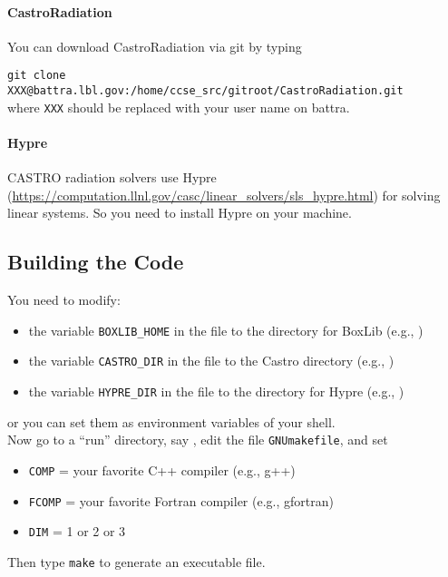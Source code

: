 \documentclass[11pt,letterpaper]{article}
\begin{document}
\paragraph{CastroRadiation} You can download CastroRadiation via git by typing
\vspace{5pt}

\verb|git clone XXX@battra.lbl.gov:/home/ccse_src/gitroot/CastroRadiation.git|\\[5pt]
where {\tt XXX} should be replaced with your user name on battra.  

\paragraph{Hypre} CASTRO radiation solvers use Hypre
(\url{https://computation.llnl.gov/casc/linear_solvers/sls_hypre.html})
for solving linear systems.  So you need to install Hypre on your
machine.

\subsection{Building the Code}

You need to modify:
\begin{itemize}
\item the variable {\tt BOXLIB\_HOME} in the file
  {\tt{}} to the
  directory for BoxLib (e.g., {\tt{}})
\item the variable {\tt CASTRO\_DIR} in the file
  {\tt{}} to
  the Castro directory
  (e.g., {\tt{}})
\item the variable {\tt HYPRE\_DIR} in the file
  {\tt{}} to
  the directory for Hypre (e.g., {\tt{}})
\end{itemize}
or you can set them as environment variables of your shell.  \\


Now go to a ``run'' directory, say
{\tt{}},
edit the file {\tt GNUmakefile}, and set
\begin{itemize}
\item {\tt COMP} = your favorite C++ compiler (e.g., g++)
\item {\tt FCOMP} = your favorite Fortran compiler (e.g., gfortran)
\item {\tt DIM}   = 1 or 2 or 3
\end{itemize}
Then type {\tt make} to generate an executable file.  
\end{document}
